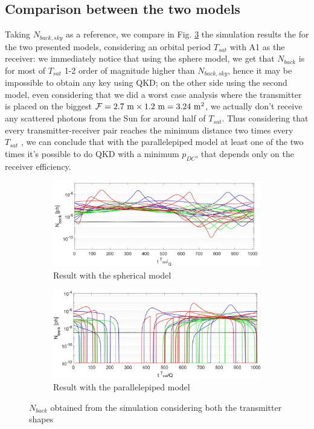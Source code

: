 \documentclass[twocolumn]{article}
\begin{document}
	\subsection{Comparison between the two models}
	Taking $N_{back,sky}$ as a reference, we compare in Fig. \ref{fig:simShape} the simulation results the for the two presented models, considering an orbital period $T_{sat}$ with A1 as the receiver: we immediately notice that using the sphere model, we get that $N_{back}$ is for most of $T_{sat}$ 1-2 order of magnitude higher than $N_{back,sky}$, hence it may be impossible to obtain any key using QKD; on the other side using the second model, even considering that we did a worst case analysis where the transmitter is placed on the biggest ${\rm \mathcal{F}= 2.7\ m \times 1.2\ m =3.24\ m^2}$, we actually don't receive any scattered photons from the Sun for around half of $T_{sat}$. Thus considering that every transmitter-receiver pair reaches the minimum distance two times every $T_{sat}$ \cite{gerlin13}, we can conclude that with the parallelepiped model at least one of the two times it's possible to do QKD with a minimum $p_{DC}$, that depends only on the receiver efficiency.
	\begin{figure}[h]
		\centering
		\begin{subfigure}[b]{\linewidth}
			\includegraphics[width=\linewidth]{simSphere}
			\caption{Result with the spherical model}
			\label{fig:simSphere}
		\end{subfigure}
		\begin{subfigure}[b]{\linewidth}
			\includegraphics[width=\linewidth]{simParal}
			\caption{Result with the parallelepiped model}
			\label{fig:simParal}
		\end{subfigure}
		\caption{$N_{back}$ obtained from the simulation considering both the transmitter shapes}\label{fig:simShape}
	\end{figure}
\end{document}
